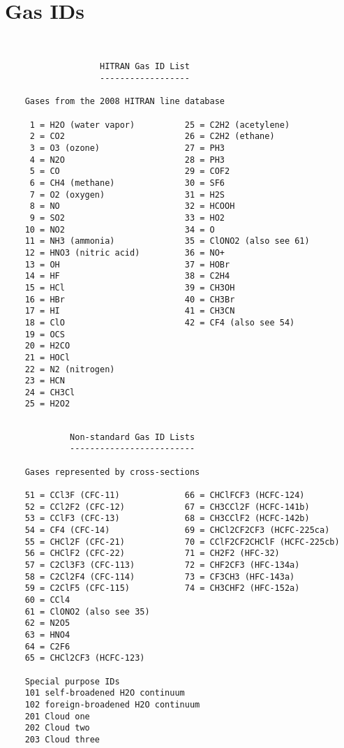 \documentclass[11pt]{article}
\begin{document}
\section{Gas IDs}
{\footnotesize
\begin{verbatim}


                   HITRAN Gas ID List
                   ------------------
                                    
    Gases from the 2008 HITRAN line database
    
     1 = H2O (water vapor)          25 = C2H2 (acetylene)
     2 = CO2                        26 = C2H2 (ethane)
     3 = O3 (ozone)                 27 = PH3
     4 = N2O                        28 = PH3
     5 = CO                         29 = COF2
     6 = CH4 (methane)              30 = SF6
     7 = O2 (oxygen)                31 = H2S
     8 = NO                         32 = HCOOH
     9 = SO2                        33 = HO2
    10 = NO2                        34 = O
    11 = NH3 (ammonia)              35 = ClONO2 (also see 61)
    12 = HNO3 (nitric acid)         36 = NO+
    13 = OH                         37 = HOBr
    14 = HF                         38 = C2H4
    15 = HCl                        39 = CH3OH
    16 = HBr                        40 = CH3Br
    17 = HI                         41 = CH3CN
    18 = ClO                        42 = CF4 (also see 54)
    19 = OCS
    20 = H2CO
    21 = HOCl
    22 = N2 (nitrogen)
    23 = HCN
    24 = CH3Cl
    25 = H2O2

\end{verbatim}
}
\newpage
{\footnotesize
\begin{verbatim}

             Non-standard Gas ID Lists
             -------------------------

    Gases represented by cross-sections
 
    51 = CCl3F (CFC-11)             66 = CHClFCF3 (HCFC-124)
    52 = CCl2F2 (CFC-12)            67 = CH3CCl2F (HCFC-141b)
    53 = CClF3 (CFC-13)             68 = CH3CClF2 (HCFC-142b)
    54 = CF4 (CFC-14)               69 = CHCl2CF2CF3 (HCFC-225ca)
    55 = CHCl2F (CFC-21)            70 = CClF2CF2CHClF (HCFC-225cb)
    56 = CHClF2 (CFC-22)            71 = CH2F2 (HFC-32)
    57 = C2Cl3F3 (CFC-113)          72 = CHF2CF3 (HFC-134a)
    58 = C2Cl2F4 (CFC-114)          73 = CF3CH3 (HFC-143a)
    59 = C2ClF5 (CFC-115)           74 = CH3CHF2 (HFC-152a)
    60 = CCl4
    61 = ClONO2 (also see 35)
    62 = N2O5
    63 = HNO4
    64 = C2F6
    65 = CHCl2CF3 (HCFC-123)

    Special purpose IDs
    101 self-broadened H2O continuum
    102 foreign-broadened H2O continuum
    201 Cloud one
    202 Cloud two
    203 Cloud three

\end{verbatim}
}
\end{document}
